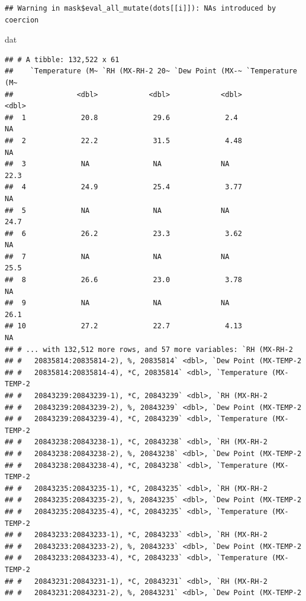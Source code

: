 \documentclass[]{article}
\newenvironment{Shaded}{\begin{snugshade}}{\end{snugshade}}
\newcommand{\NormalTok}[1]{#1}
\begin{document}
\begin{verbatim}
## Warning in mask$eval_all_mutate(dots[[i]]): NAs introduced by coercion
\end{verbatim}

\begin{Shaded}
\begin{Highlighting}[]
\NormalTok{dat}
\end{Highlighting}
\end{Shaded}

\begin{verbatim}
## # A tibble: 132,522 x 61
##    `Temperature (M~ `RH (MX-RH-2 20~ `Dew Point (MX-~ `Temperature (M~
##               <dbl>            <dbl>            <dbl>            <dbl>
##  1             20.8             29.6             2.4              NA  
##  2             22.2             31.5             4.48             NA  
##  3             NA               NA              NA                22.3
##  4             24.9             25.4             3.77             NA  
##  5             NA               NA              NA                24.7
##  6             26.2             23.3             3.62             NA  
##  7             NA               NA              NA                25.5
##  8             26.6             23.0             3.78             NA  
##  9             NA               NA              NA                26.1
## 10             27.2             22.7             4.13             NA  
## # ... with 132,512 more rows, and 57 more variables: `RH (MX-RH-2
## #   20835814:20835814-2), %, 20835814` <dbl>, `Dew Point (MX-TEMP-2
## #   20835814:20835814-4), *C, 20835814` <dbl>, `Temperature (MX-TEMP-2
## #   20843239:20843239-1), *C, 20843239` <dbl>, `RH (MX-RH-2
## #   20843239:20843239-2), %, 20843239` <dbl>, `Dew Point (MX-TEMP-2
## #   20843239:20843239-4), *C, 20843239` <dbl>, `Temperature (MX-TEMP-2
## #   20843238:20843238-1), *C, 20843238` <dbl>, `RH (MX-RH-2
## #   20843238:20843238-2), %, 20843238` <dbl>, `Dew Point (MX-TEMP-2
## #   20843238:20843238-4), *C, 20843238` <dbl>, `Temperature (MX-TEMP-2
## #   20843235:20843235-1), *C, 20843235` <dbl>, `RH (MX-RH-2
## #   20843235:20843235-2), %, 20843235` <dbl>, `Dew Point (MX-TEMP-2
## #   20843235:20843235-4), *C, 20843235` <dbl>, `Temperature (MX-TEMP-2
## #   20843233:20843233-1), *C, 20843233` <dbl>, `RH (MX-RH-2
## #   20843233:20843233-2), %, 20843233` <dbl>, `Dew Point (MX-TEMP-2
## #   20843233:20843233-4), *C, 20843233` <dbl>, `Temperature (MX-TEMP-2
## #   20843231:20843231-1), *C, 20843231` <dbl>, `RH (MX-RH-2
## #   20843231:20843231-2), %, 20843231` <dbl>, `Dew Point (MX-TEMP-2

\end{verbatim}
\end{document}

